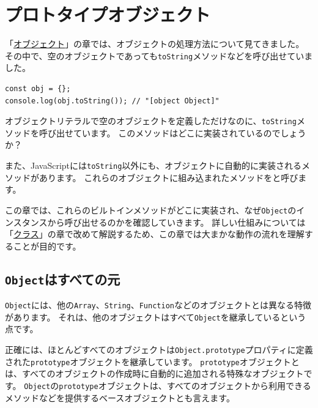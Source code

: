 \hypertarget{prototype-object}{%
\chapter{プロトタイプオブジェクト}\label{prototype-object}}
\thispagestyle{frontheadings}

「\href{../object/README.md}{オブジェクト}」の章では、オブジェクトの処理方法について見てきました。
その中で、空のオブジェクトであっても\texttt{toString}メソッドなどを呼び出せていました。

\begin{lstlisting}
const obj = {};
console.log(obj.toString()); // "[object Object]"
\end{lstlisting}

オブジェクトリテラルで空のオブジェクトを定義しただけなのに、\texttt{toString}メソッドを呼び出せています。
このメソッドはどこに実装されているのでしょうか？

また、JavaScriptには\texttt{toString}以外にも、オブジェクトに自動的に実装されるメソッドがあります。
これらのオブジェクトに組み込まれたメソッドを\textbf{}と呼びます。

この章では、これらのビルトインメソッドがどこに実装され、なぜ\texttt{Object}のインスタンスから呼び出せるのかを確認していきます。
詳しい仕組みについては「\hyperlink{class}{クラス}」の章で改めて解説するため、この章では大まかな動作の流れを理解することが目的です。

\hypertarget{object-is-origin}{%
\section{\texorpdfstring{\texttt{Object}はすべての元}{Objectはすべての元}}\label{object-is-origin}}

\texttt{Object}には、他の\texttt{Array}、\texttt{String}、\texttt{Function}などのオブジェクトとは異なる特徴があります。
それは、他のオブジェクトはすべて\texttt{Object}を継承しているという点です。

正確には、ほとんどすべてのオブジェクトは\texttt{Object.prototype}プロパティに定義された\texttt{prototype}オブジェクトを継承しています。
\texttt{prototype}オブジェクトとは、すべてのオブジェクトの作成時に自動的に追加される特殊なオブジェクトです。
\texttt{Object}の\texttt{prototype}オブジェクトは、すべてのオブジェクトから利用できるメソッドなどを提供するベースオブジェクトとも言えます。

